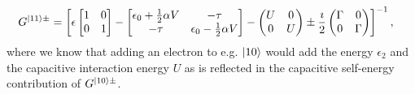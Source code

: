\begin{align*}
G^{\ket{11}\pm} &= \left[ \epsilon \begin{bmatrix} 1 & 0 \\ 0 & 1 \end{bmatrix} - \begin{bmatrix} \epsilon_0 + \frac{1}{2} \alpha V & -\tau \\
-\tau & \epsilon_0 - \frac{1}{2} \alpha V\end{bmatrix} - \begin{pmatrix} U & 0 \\ 0 & U \end{pmatrix} \pm \frac{\imath}{2} \begin{pmatrix} \Gamma & 0 \\ 0 & \Gamma \end{pmatrix} \right]^{-1},
\end{align*}
where we know that adding an electron to e.g. $\ket{10}$ would add the energy $\epsilon_2$ and the capacitive interaction energy $U$ as is reflected in the capacitive self-energy contribution of $G^{\ket{10}\pm}$. 

